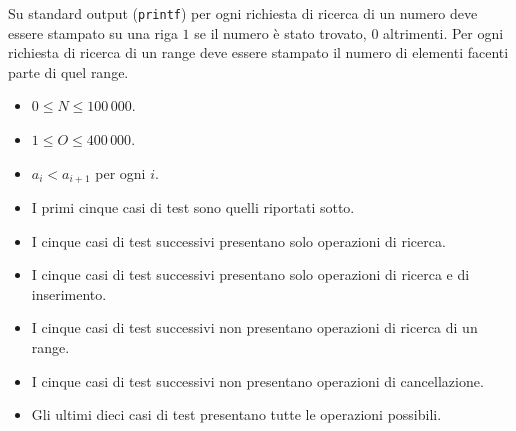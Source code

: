 \OutputFile
Su standard output (\texttt{printf}) per ogni richiesta di ricerca di un
numero deve essere stampato su una riga $1$ se il numero è stato trovato, $0$
altrimenti. Per ogni richiesta di ricerca di un range deve essere stampato il
numero di elementi facenti parte di quel range.
	


\Constraints

\begin{itemize}[nolistsep, itemsep=2mm]
    \item $0 \leq N \leq 100\,000$.
    \item $1 \leq O \leq 400\,000$.
    \item $a_i < a_{i+1}$ per ogni $i$.
    \item I primi cinque casi di test sono quelli riportati sotto.
    \item I cinque casi di test successivi presentano solo operazioni di
        ricerca.
    \item I cinque casi di test successivi presentano solo operazioni di
        ricerca e di inserimento.
    \item I cinque casi di test successivi non presentano operazioni di
        ricerca di un range.
    \item I cinque casi di test successivi non presentano operazioni di
        cancellazione.
    \item Gli ultimi dieci casi di test presentano tutte le operazioni
        possibili.
\end{itemize}



\Examples

\begin{example}
%
\end{example}
\begin{example}
%
\end{example}
\begin{example}
%
\end{example}
\begin{example}
%
\end{example}
\begin{example}
%
\end{example}



